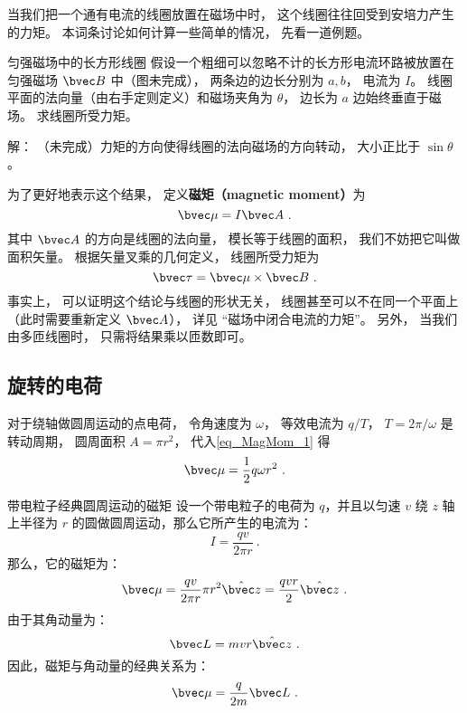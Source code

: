 
\begin{issues}
\issueTODO
\end{issues}


当我们把一个通有电流的线圈放置在磁场中时， 这个线圈往往回受到安培力产生的力矩。 本词条讨论如何计算一些简单的情况， 先看一道例题。

\begin{example}{匀强磁场中的长方形线圈}
假设一个粗细可以忽略不计的长方形电流环路被放置在匀强磁场 $\bvec B$ 中（图未完成）， 两条边的边长分别为 $a, b$， 电流为 $I$。 线圈平面的法向量（由右手定则定义）和磁场夹角为 $\theta$， 边长为 $a$ 边始终垂直于磁场。 求线圈所受力矩。

解： （未完成）力矩的方向使得线圈的法向磁场的方向转动， 大小正比于 $\sin\theta$。
\end{example}

为了更好地表示这个结果， 定义\textbf{磁矩（magnetic moment）}为
\begin{equation}\label{eq_MagMom_1}
\bvec \mu = I \bvec A~.
\end{equation}
其中 $\bvec A$ 的方向是线圈的法向量， 模长等于线圈的面积， 我们不妨把它叫做面积矢量。 根据矢量叉乘的几何定义， 线圈所受力矩为
\begin{equation}
\bvec \tau = \bvec \mu \times \bvec B~.
\end{equation}
事实上， 可以证明这个结论与线圈的形状无关， 线圈甚至可以不在同一个平面上（此时需要重新定义 $\bvec A$）， 详见 “磁场中闭合电流的力矩”。 另外， 当我们由多匝线圈时， 只需将结果乘以匝数即可。

\subsection{旋转的电荷}
对于绕轴做圆周运动的点电荷， 令角速度为 $\omega$， 等效电流为 $q/T$， $T = 2\pi/\omega$ 是转动周期， 圆周面积 $A = \pi r^2$， 代入\autoref{eq_MagMom_1} 得
\begin{equation}
\bvec \mu = \frac{1}{2} q\omega r^2~.
\end{equation}

\begin{example}{带电粒子经典圆周运动的磁矩}\label{ex_MagMom_1}
设一个带电粒子的电荷为 $q$，并且以匀速 $v$ 绕 $z$ 轴上半径为 $r$ 的圆做圆周运动，那么它所产生的电流为：
\begin{equation}
I=\frac{qv}{2\pi r}~.
\end{equation}
那么，它的磁矩为：
\begin{equation}
\bvec\mu  = \frac{qv}{2\pi r}\pi r^2 \hat{\bvec z}=\frac{qvr}{2} \hat{\bvec z} ~.
\end{equation}
由于其角动量为：
\begin{equation}
\bvec L =mvr\hat{\bvec z}~.
\end{equation}
因此，磁矩与角动量的经典关系为：
\begin{equation}
\bvec\mu  = \frac{q}{2m}\bvec L~.
\end{equation}

\end{example}
